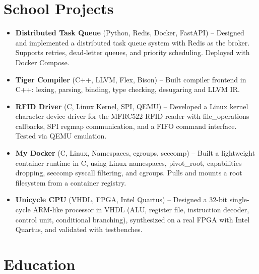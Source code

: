 \documentclass[9pt,a4paper]{article}
\begin{document}
\section*{School Projects}
\begin{tcolorbox}[mybox]
\begin{itemize}
\item \textbf{Distributed Task Queue} (Python, Redis, Docker, FastAPI) -- Designed and implemented a distributed task queue system with Redis as the broker. Supports retries, dead-letter queues, and priority scheduling. Deployed with Docker Compose.

\item \textbf{Tiger Compiler} (C++, LLVM, Flex, Bison) -- Built compiler frontend in C++: lexing, parsing, binding, type checking, desugaring and LLVM IR.

\item \textbf{RFID Driver} (C, Linux Kernel, SPI, QEMU) -- Developed a Linux kernel character device driver for the MFRC522 RFID reader with file\_operations callbacks, SPI regmap communication, and a FIFO command interface. Tested via QEMU emulation.

\item \textbf{My Docker} (C, Linux, Namespaces, cgroups, seccomp) -- Built a lightweight container runtime in C, using Linux namespaces, pivot\_root, capabilities dropping, seccomp syscall filtering, and cgroups. Pulls and mounts a root filesystem from a container registry.

\item \textbf{Unicycle CPU} (VHDL, FPGA, Intel Quartus) -- Designed a 32-bit single-cycle ARM-like processor in VHDL (ALU, register file, instruction decoder, control unit, conditional branching), synthesized on a real FPGA with Intel Quartus, and validated with testbenches.
\end{itemize}
\end{tcolorbox}


\section*{Education}
\begin{tcolorbox}[mybox]
\begin{itemize}
\end{itemize}
\end{tcolorbox}
\end{document}
